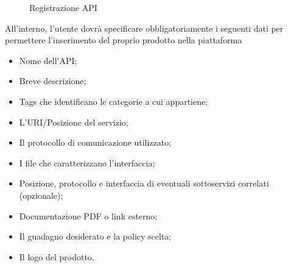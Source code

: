 \label{Registrazione API}
\begin{figure}[H]
	\centering
	\caption{Registrazione API}
\end{figure}

All'interno, l'utente dovrà specificare obbligatoriamente i seguenti dati per permettere l'inserimento del proprio prodotto nella piattaforma

\begin{itemize}
	\item Nome dell'API;
	\item Breve descrizione;
	\item Tags che identificano le categorie a cui appartiene;
	\item L'URI/Posizione del servizio;
	\item Il protocollo di comunicazione utilizzato;
	\item I file che caratterizzano l'interfaccia;
	\item Posizione, protocollo e interfaccia di eventuali sottoservizi correlati (opzionale);
	\item Documentazione PDF o link esterno;
	\item Il guadagno desiderato e la policy scelta;
	\item Il logo del prodotto.
\end{itemize}


